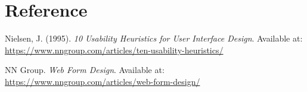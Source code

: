 \chapter{Reference}
\label{chap:ref}

\begin{thebibliography}{99}
    Nielsen, J. (1995). \emph{10 Usability Heuristics for User Interface Design}.
    Available at: \url{https://www.nngroup.com/articles/ten-usability-heuristics/}

    NN Group. \emph{Web Form Design}.
    Available at: \url{https://www.nngroup.com/articles/web-form-design/}
\end{thebibliography}
